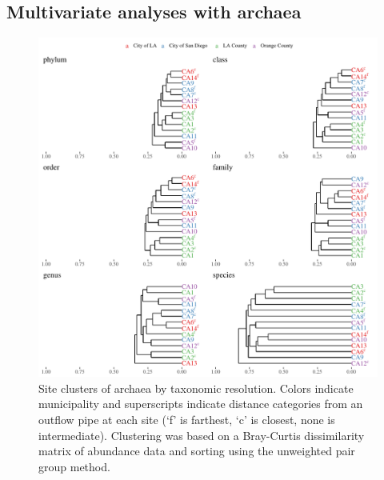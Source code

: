\documentclass[letterpaper,12pt]{article}\usepackage[]{graphicx}\usepackage[]{color}
\newenvironment{knitrout}{}{} %
\begin{document}
\subsection{Multivariate analyses with archaea}

\begin{knitrout}
\color{fgcolor}\begin{figure}[!ht]

{\centering \includegraphics[width=\textwidth]{figs/clust1_arch-1} 

}

\caption[Site clusters of archaea by taxonomic resolution]{Site clusters of archaea by taxonomic resolution.  Colors indicate municipality and superscripts indicate distance categories from an outflow pipe at each site (`f' is farthest, `c' is closest, none is intermediate).  Clustering was based on a Bray-Curtis dissimilarity matrix of abundance data and sorting using the unweighted pair group method.}\label{fig:clust1_arch}
\end{figure}


\end{knitrout}
\end{document}

